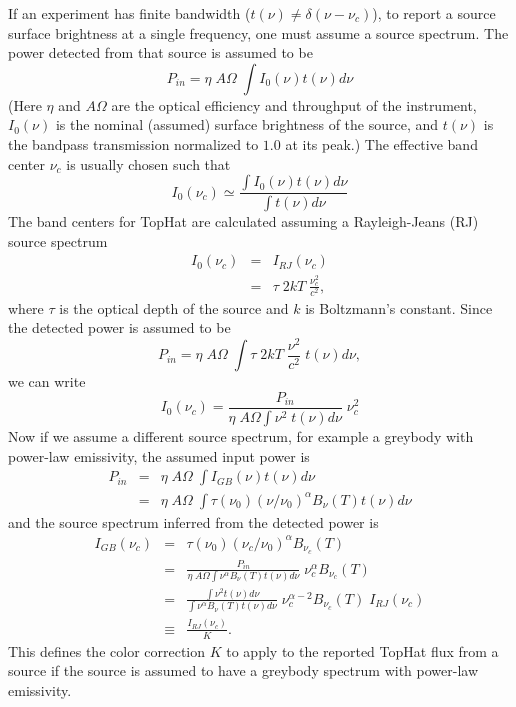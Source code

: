 \documentclass[12pt,preprint]{aastex}
\begin{document}
If an experiment has finite bandwidth ($t(\nu) \ne \delta(\nu -
\nu_c)$), to report a source surface brightness at a single
frequency, one must assume a source spectrum.  The power detected from
that source is assumed to be
\begin{equation}
P_{in} = \eta \; A \Omega \; \int I_0(\nu) t(\nu) d \nu
\end{equation}
(Here $\eta$ and $A \Omega$ are the optical efficiency and throughput
of the instrument, $I_0(\nu)$ is the nominal (assumed) surface
brightness of the source, and $t(\nu)$ is the bandpass transmission
normalized to $1.0$ at its peak.)  The effective band center $\nu_c$
is usually chosen such that
\begin{equation}
I_0(\nu_c) \simeq \frac{\int I_0(\nu) t(\nu) d \nu}
{\int t(\nu) d \nu} 
\end{equation}
The band centers for TopHat are calculated assuming a Rayleigh-Jeans
(RJ) source spectrum
\begin{eqnarray}
I_0(\nu_c) & = & I_{RJ}(\nu_c) \\
\nonumber & = & \tau \; 2 k T \; \frac{\nu_c^2}{c^2},
\end{eqnarray}
where $\tau$ is the optical depth of the source and $k$ is Boltzmann's
constant.  Since the detected power is assumed to be
\begin{equation}
P_{in} = \eta \; A \Omega \; \int \tau \; 2 k T \; \frac{\nu^2}{c^2}
\; t(\nu) d \nu,
\end{equation}
we can write
\begin{equation}
I_0(\nu_c) = \frac{P_{in}}{\eta \; A \Omega \int \nu^2 \; t(\nu) d \nu} \; \nu_c^2
\end{equation}
Now if we assume a different source spectrum, for example a greybody
with power-law emissivity, the assumed input power is
\begin{eqnarray}
P_{in} & = & \eta \; A \Omega \; \int I_{GB}(\nu) t(\nu) d \nu \\
\nonumber & = & \eta \; A \Omega \; \int \tau(\nu_0) (\nu / \nu_0)^\alpha B_\nu(T) t(\nu) d \nu
\end{eqnarray}
and the source spectrum inferred from the detected power is
\begin{eqnarray}
I_{GB}(\nu_c) & = & \tau(\nu_0) (\nu_c / \nu_0)^\alpha B_{\nu_c}(T) \\
\nonumber & = & \frac{P_{in}}{\eta \; A \Omega \int \nu^\alpha B_\nu(T) t(\nu) d \nu} \; \nu_c^\alpha B_{\nu_c}(T) \\
\nonumber & = & \frac{\int \nu^2 t(\nu) d \nu}{\int \nu^\alpha B_\nu(T) t(\nu) d \nu} \; \nu_c^{\alpha-2} B_{\nu_c}(T) \; I_{RJ}(\nu_c) \\
\nonumber & \equiv & \frac{I_{RJ}(\nu_c)}{K}.
\end{eqnarray}
This defines the color correction $K$ to apply to the reported TopHat
flux from a source if the source is assumed to have a greybody
spectrum with power-law emissivity.
\end{document}
